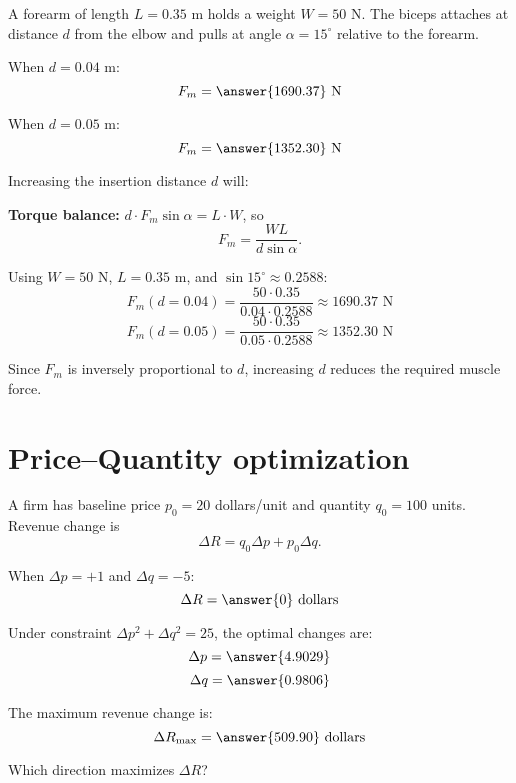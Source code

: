 \documentclass{ximera}
\begin{document}
\begin{problem}
A forearm of length \(L=0.35\) m holds a weight \(W=50\) N. The biceps attaches at distance \(d\) from the elbow and pulls at angle \(\alpha=15^\circ\) relative to the forearm.

When \(d=0.04\) m:
\[
F_m = \answer{1690.37} \text{ N}
\]

When \(d=0.05\) m:
\[
F_m = \answer{1352.30} \text{ N}
\]

Increasing the insertion distance \(d\) will:
\begin{multipleChoice}
\end{multipleChoice}
\end{problem}

\begin{solution}
\textbf{Torque balance:} \(d \cdot F_m \sin\alpha = L \cdot W\), so
\[
F_m = \frac{WL}{d\sin\alpha}.
\]

Using \(W=50\) N, \(L=0.35\) m, and \(\sin 15^\circ \approx 0.2588\):
\[
F_m(d=0.04) = \frac{50 \cdot 0.35}{0.04 \cdot 0.2588} \approx 1690.37 \text{ N}
\]
\[
F_m(d=0.05) = \frac{50 \cdot 0.35}{0.05 \cdot 0.2588} \approx 1352.30 \text{ N}
\]

Since \(F_m\) is inversely proportional to \(d\), increasing \(d\) reduces the required muscle force.
\end{solution}

\section*{Price--Quantity optimization}

\begin{problem}
A firm has baseline price \(p_0=20\) dollars/unit and quantity \(q_0=100\) units. Revenue change is
\[
\Delta R = q_0 \Delta p + p_0 \Delta q.
\]

When \(\Delta p = +1\) and \(\Delta q = -5\):
\[
\Delta R = \answer{0} \text{ dollars}
\]

Under constraint \(\Delta p^2 + \Delta q^2 = 25\), the optimal changes are:
\[
\Delta p = \answer{4.9029}
\]
\[
\Delta q = \answer{0.9806}
\]

The maximum revenue change is:
\[
\Delta R_{\max} = \answer{509.90} \text{ dollars}
\]

Which direction maximizes \(\Delta R\)?
\begin{multipleChoice}
\end{multipleChoice}
\end{problem}
\end{document}
